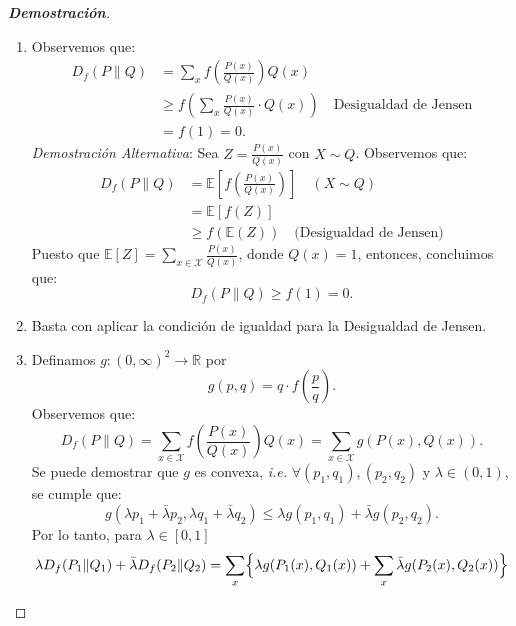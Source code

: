 \begin{proof}[\textbf{Demostraci\'on}]
\begin{enumerate}[label=(\alph*)]
    \item Observemos que:
    \begin{align*}
        D_f(P\|Q)&=\sum_xf\left(\frac{P(x)}{Q(x)}\right)Q(x)\\
        &\geq f\left(\sum_{x}\frac{P(x)}{Q(x)}\cdot Q(x)\right)\quad\text{Desigualdad de Jensen}\\
        &=f(1)=0.
    \end{align*}
    \textit{Demostraci\'on Alternativa}: Sea $Z=\frac{P(x)}{Q(x)}$ con $X\sim Q$. Observemos que:
    \begin{align*}
        D_f(P\|Q)&=\mathbb{E}\left[f\left(\frac{P(x)}{Q(x)}\right)\right]\quad(X\sim Q)\\
        &=\mathbb{E}[f(Z)]\\
        &\geq f(\mathbb{E}(Z))\quad\text{(Desigualdad de Jensen)}
    \end{align*}
    Puesto que $\mathbb{E}[Z]=\sum_{x\in\mathcal{X}}\frac{P(x)}{Q(x)}$, donde $Q(x)=1$, entonces, concluimos que:
    \begin{equation*}
        D_f(P\|Q)\geq f(1)=0.
    \end{equation*}
    \item Basta con aplicar la condici\'on de igualdad para la Desigualdad de Jensen.
    \item Definamos $g:(0,\infty)^2\to\mathbb{R}$ por
    \begin{equation*}
        g(p,q)=q\cdot f\left(\frac{p}{q}\right).
    \end{equation*}
    Observemos que:
    \begin{equation*}
        D_f(P\|Q)=\sum_{x\in\mathcal{X}}f\left(\frac{P(x)}{Q(x)}\right)Q(x)=\sum_{x\in\mathcal{X}}g(P(x),Q(x)).
    \end{equation*}
    Se puede demostrar que $g$ es convexa, \textit{i.e.} $\forall (p_1,q_1),(p_2,q_2)$ y $\lambda\in(0,1)$, se cumple que:
    \begin{equation*}
        g(\lambda p_1+\bar{\lambda}p_2,\lambda q_1+\bar{\lambda}q_2)\leq \lambda g(p_1,q_1)+\bar{\lambda}g(p_2,q_2).
    \end{equation*}
    Por lo tanto, para $\lambda\in[0,1]$
    \begin{align*}
        \lambda D_f(P_1\|Q_1)+\bar{\lambda}D_f(P_2\|Q_2)
        &=\sum_{x}\Bigl\{\lambda g(P_1(x),Q_1(x))+\sum_{x}\bar{\lambda}g(P_2(x),Q_2(x))\Bigl\}\\

\end{align*}
\end{enumerate}
\end{proof}
